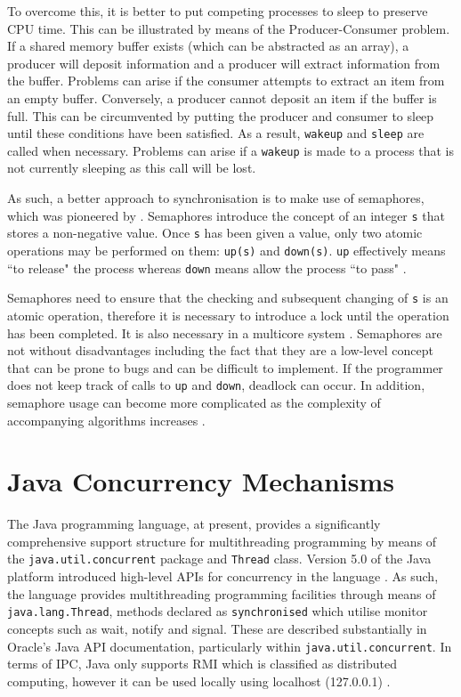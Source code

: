 \documentclass[12pt] {newrucsthesis}    %
\def\code#1{\texttt{#1}}
\begin{document}
        To overcome this, it is better to put competing processes to sleep to preserve CPU time. This can be illustrated by
        means of the Producer-Consumer problem. If a shared memory buffer exists (which can be abstracted as an array),
        a producer will deposit information and a producer will extract information from the buffer. Problems can arise if
        the consumer attempts to extract an item from an empty buffer. Conversely, a producer cannot deposit an item if the
        buffer is full. This can be circumvented by putting the producer and consumer to sleep until these conditions have
        been satisfied. As a result, \code{wakeup} and \code{sleep} are called when necessary. Problems can arise if a \code{wakeup}
        is made to a process that is not currently sleeping as this call will be lost.

        As such, a better approach to synchronisation is to make use of semaphores, which was pioneered by \cite{dijkstraSems}.
        Semaphores introduce the concept of an integer \code{s} that stores a non-negative value. Once \code{s} has been given a
        value, only two atomic operations may be performed on them: \code{up(s)} and \code{down(s)}. \code{up} effectively
        means ``to release" the process whereas \code{down} means allow the process ``to pass" \citep{trainBook}.

        Semaphores need to ensure that the checking and subsequent changing of \code{s} is an atomic operation, therefore
        it is necessary to introduce a lock until the operation has been completed. It is also necessary in a multicore
        system \citep{modernOS}. Semaphores are not without disadvantages including the fact that they are a low-level
        concept that can be prone to bugs and can be difficult to implement. If the programmer does not keep track of calls
        to \code{up} and \code{down}, deadlock can occur. In addition, semaphore usage can become more complicated as the
        complexity of accompanying algorithms increases \citep{semDisadvantages}.

    \section{Java Concurrency Mechanisms}
      The Java programming language, at present, provides a significantly comprehensive support structure
      for multithreading programming by means of the \code{java.util.concurrent} package and \code{Thread}
      class. Version 5.0 of the Java platform introduced high-level APIs for concurrency in the
      language \citep{JavaAPI}. As such, the language provides multithreading programming facilities
      through means of \code{java.lang.Thread}, methods declared as \code{synchronised} which utilise
      monitor concepts such as wait, notify and signal. These are described substantially in Oracle's
      Java API documentation, particularly within \code{java.util.concurrent}. In terms of IPC, Java only
      supports RMI which is classified as distributed computing, however it can be used locally using
      localhost (127.0.0.1) \citep{WellsIPCJava}.
\end{document}
